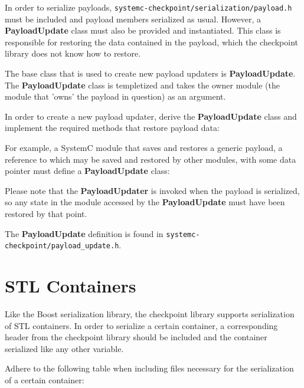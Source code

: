\documentclass[oneside]{memoir}
\begin{document}
In order to serialize payloads, \texttt{systemc-checkpoint/serialization/payload.h} must be included and payload members serialized as usual.
However, a \textbf{PayloadUpdate} class must also be provided and instantiated.
This class is responsible for restoring the data contained in the payload, which the checkpoint library does not know how to restore.

The base class that is used to create new payload updaters is \textbf{PayloadUpdate}.
The \textbf{PayloadUpdate} class is templetized and takes the owner module (the module that 'owns' the payload in question) as an argument.

In order to create a new payload updater, derive the \textbf{PayloadUpdate} class and implement the required methods that restore payload data:



For example, a SystemC module that saves and restores a generic payload, a reference to which may be saved and restored by other modules, with some data pointer must define a \textbf{PayloadUpdate} class:



Please note that the \textbf{PayloadUpdater} is invoked when the payload is serialized, so any state in the module accessed by the \textbf{PayloadUpdate} must have been restored by that point.

The \textbf{PayloadUpdate} definition is found in \texttt{systemc-checkpoint/payload\_update.h}.

\section{STL Containers}
\label{stl}

Like the Boost serialization library, the checkpoint library supports serialization of STL containers.
In order to serialize a certain container, a corresponding header from the checkpoint library should be included and the container serialized like any other variable.

Adhere to the following table when including files necessary for the serialization of a certain container:
\end{document}
